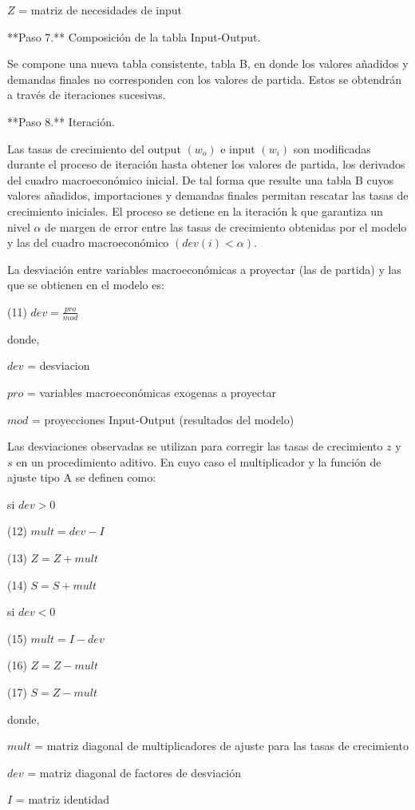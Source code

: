 \documentclass{article}
\begin{document}
$Z$ = matriz de necesidades de input

**Paso 7.** Composición de la tabla Input-Output.

Se compone una nueva tabla consistente, tabla B, en donde los valores añadidos y demandas finales no corresponden con los valores de partida.  Estos se obtendrán a través de iteraciones sucesivas.

**Paso 8.** Iteración.

Las tasas de crecimiento del output $(w_o)$ e input $(w_i)$ son modificadas durante el proceso de iteración hasta obtener los valores de partida, los derivados del cuadro macroeconómico inicial. De tal forma que resulte una tabla B cuyos valores añadidos, importaciones y demandas finales permitan rescatar las tasas de crecimiento iniciales. El proceso se detiene en la iteración k que garantiza un nivel $\alpha$ de margen de error entre las tasas de crecimiento obtenidas por el modelo y las del cuadro macroeconómico $(dev(i)<\alpha)$.

La desviación entre variables macroeconómicas a  proyectar (las de partida) y las que se obtienen en el modelo es:

(11) $dev = \frac {pro}{mod}$

donde,

$dev$ = desviacion

$pro$ = variables macroeconómicas exogenas a proyectar

$mod$ = proyecciones Input-Output (resultados del modelo)

Las desviaciones observadas se utilizan para corregir las tasas de crecimiento $z$ y $s$ en un procedimiento aditivo. En cuyo caso el multiplicador y la función de ajuste tipo A se definen como:


si $dev > 0$

(12) $mult = dev - I$

(13) $Z = Z + mult$

(14) $S = S + mult$


si $dev < 0$

(15) $mult = I - dev$

(16) $Z = Z - mult$

(17) $S = Z - mult$

donde,

$mult$ = matriz diagonal de multiplicadores de ajuste para las tasas de crecimiento

$dev$ = matriz diagonal de factores de desviación

$I$ = matriz identidad
\end{document}
